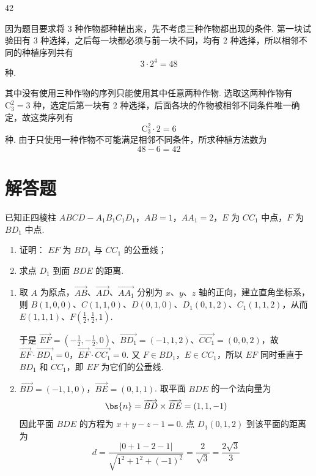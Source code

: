 \begin{answer}
42
\end{answer}

\begin{solution}
因为题目要求将 \(3\) 种作物都种植出来，先不考虑三种作物都出现的条件. 第一块试验田有 \(3\) 种选择，之后每一块都必须与前一块不同，均有 \(2\) 种选择，所以相邻不同的种植序列共有
\[
3\cdot2^4=48
\]
种.

其中没有使用三种作物的序列只能使用其中任意两种作物. 选取这两种作物有 \(\mathrm C_3^2=3\) 种，选定后第一块有 \(2\) 种选择，后面各块的作物被相邻不同条件唯一确定，故这类序列有
\[
\mathrm C_3^2\cdot2=6
\]
种. 由于只使用一种作物不可能满足相邻不同条件，所求种植方法数为
\[
48-6=42
\]
\end{solution}

\section{解答题}
\begin{problem}
已知正四棱柱 \(ABCD - A_{1}B_{1}C_{1}D_{1}\)，\(AB = 1\)，\(AA_{1} = 2\)，\(E\) 为 \(CC_{1}\) 中点，\(F\) 为 \(BD_{1}\) 中点.

\begin{enumerate}
\item 证明： \(EF\) 为 \(BD_{1}\) 与 \(CC_{1}\) 的公垂线；
\item 求点 \(D_{1}\) 到面 \(BDE\) 的距离.
\end{enumerate}

\begin{solution}
\begin{enumerate}
\item 取 \(A\) 为原点，\(\overrightarrow{AB}\)、\(\overrightarrow{AD}\)、\(\overrightarrow{AA_{1}}\) 分别为 \(x\)、\(y\)、\(z\) 轴的正向，建立直角坐标系，则
\(B(1,0,0)\)、\(C(1,1,0)\)、\(D(0,1,0)\)、\(D_{1}(0,1,2)\)、\(C_{1}(1,1,2)\)，从而
\(E(1,1,1)\)、\(F\left(\frac{1}{2},\frac{1}{2},1\right)\).

于是 \(\overrightarrow{EF}=\left(-\frac{1}{2},-\frac{1}{2},0\right)\)、\(\overrightarrow{BD_{1}}=(-1,1,2)\)、\(\overrightarrow{CC_{1}}=(0,0,2)\)，故
\(\overrightarrow{EF}\cdot\overrightarrow{BD_{1}}=0\)，\(\overrightarrow{EF}\cdot\overrightarrow{CC_{1}}=0\). 又 \(F\in BD_{1}\)，\(E\in CC_{1}\)，所以 \(EF\) 同时垂直于 \(BD_{1}\) 和 \(CC_{1}\)，即 \(EF\) 为它们的公垂线.

\item \(\overrightarrow{BD}=(-1,1,0)\)，\(\overrightarrow{BE}=(0,1,1)\). 取平面 \(BDE\) 的一个法向量为
\[
\bs{n}=\overrightarrow{BD}\times\overrightarrow{BE}=(1,1,-1)
\]
因此平面 \(BDE\) 的方程为 \(x+y-z-1=0\). 点 \(D_{1}(0,1,2)\) 到该平面的距离为
\[
d=\frac{|0+1-2-1|}{\sqrt{1^{2}+1^{2}+(-1)^{2}}}=\frac{2}{\sqrt{3}}=\frac{2\sqrt{3}}{3}
\]
\end{enumerate}
\end{solution}
\end{problem}

